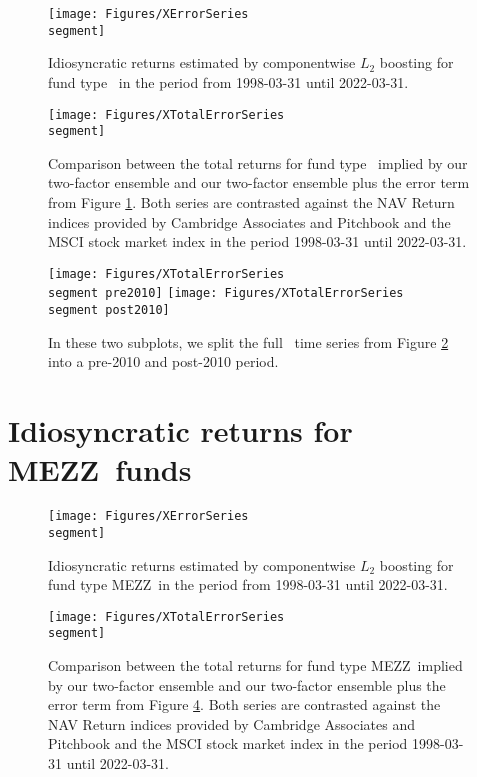 \begin{figure}[H]
	\centering
	\texttt{[image: Figures/XErrorSeries\\segment]}
	\caption{Idiosyncratic returns estimated by componentwise $L_2$ boosting for fund type \segment \ in the period from 1998-03-31 until 2022-03-31.}
	\label{fig:clb_idio_\segment}
\end{figure}

\begin{figure}[H]
	\centering
	\texttt{[image: Figures/XTotalErrorSeries\\segment]}
	\caption{
		Comparison between the total returns for fund type \segment \ implied by our two-factor ensemble and our two-factor ensemble plus the error term from Figure \ref{fig:clb_idio_\segment}.
		Both series are contrasted against the NAV Return indices provided by Cambridge Associates and Pitchbook and the MSCI stock market index in the period 1998-03-31 until 2022-03-31.
	}
	\label{fig:clb_total_\segment}
\end{figure}

\begin{figure}[H]
	\centering
	\texttt{[image: Figures/XTotalErrorSeries\\segment pre2010]}
	\texttt{[image: Figures/XTotalErrorSeries\\segment post2010]}
	\caption{
		In these two subplots, we split the full \segment \ time series from Figure \ref{fig:clb_total_\segment} into a pre-2010 and post-2010 period.
	}
	\label{fig:clb_pre_post_2010_\segment}
\end{figure}


\renewcommand{\segment}{MEZZ}

\section{Idiosyncratic returns for \segment \ funds}
\label{sec:errors_\segment}

\begin{figure}[H]
	\centering
	\texttt{[image: Figures/XErrorSeries\\segment]}
	\caption{Idiosyncratic returns estimated by componentwise $L_2$ boosting for fund type \segment \ in the period from 1998-03-31 until 2022-03-31.}
	\label{fig:clb_idio_\segment}
\end{figure}

\begin{figure}[H]
	\centering
	\texttt{[image: Figures/XTotalErrorSeries\\segment]}
	\caption{
		Comparison between the total returns for fund type \segment \ implied by our two-factor ensemble and our two-factor ensemble plus the error term from Figure \ref{fig:clb_idio_\segment}.
		Both series are contrasted against the NAV Return indices provided by Cambridge Associates and Pitchbook and the MSCI stock market index in the period 1998-03-31 until 2022-03-31.
	}
	\label{fig:clb_total_\segment}
\end{figure}


